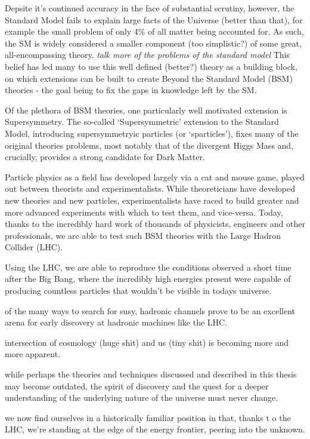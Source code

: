 Depsite it's continued accuracy in the face of substantial scrutiny, however,
the Standard Model fails to explain large facts of the Universe (better than
that), for example the small problem of only 4\% of all matter being accounted
for. As such, the SM is widely considered a smaller component (too
simplistic?) of some great, all-encompassing theory.
\emph{talk more of the problems of the standard model}
This belief has led many to use this well defined (better?) theory as a building
block, on which extensions can be built to create Beyond the Standard Model 
(BSM) theories - the goal being to fix the gaps in knowledge left by the SM.

Of the plethora of BSM theories, one particularly well motivated extension is
Supersymmetry. The so-called `Supersymmetric' extension to the Standard
Model, introducing supersymmetryic particles (or `sparticles'), fixes many of
the original theories problems, most notably that of the
divergent Higgs Mass and, crucially, provides a strong candidate for Dark
Matter.

Particle physics as a field has developed largely via a cat and mouse game,
played out between theorists and experimentalists. While theoreticians have
developed new theories and new particles, experimentalists have raced to build
greater and more advanced experiments with which to test them, and vice-versa.
Today, thanks to the incredibly hard work of thousands of physicists, engineers
and other professionals, we are able to test such BSM theories with the Large
Hadron Collider (LHC).

Using the LHC, we are able to reproduce the conditions observed a short time
after the Big Bang, where the incredibly high energies present were capable of
producing countless particles that wouldn't be visible in todays universe.

of the many ways to search for susy, hadronic channels prove to be an excellent
arena for early discovery at hadronic machines like the LHC.

intersection of cosmology (huge shit) and us (tiny shit) is becoming more and
more apparent.

while perhaps the theories and techniques discussed and described in this thesis
may become outdated, the spirit of discovery and the quest for a deeper
understanding of the underlying nature of the universe must never change.

we now find ourselves in a historically familiar position in that, thanks t
o the LHC, we're standing
at the edge of the energy frontier, peering into the unknown.
